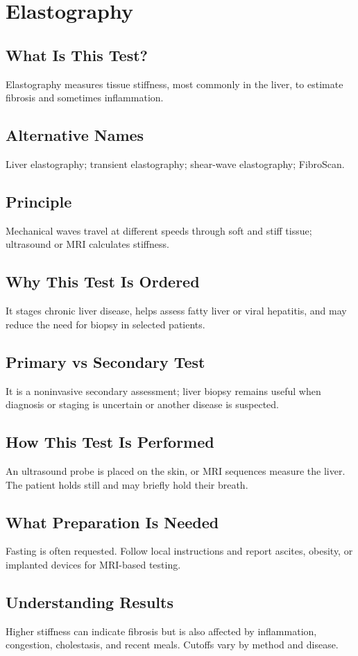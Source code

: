 \chapter{Elastography}
\section*{What Is This Test?} Elastography measures tissue stiffness, most commonly in the liver, to estimate fibrosis and sometimes inflammation.
\section*{Alternative Names} Liver elastography; transient elastography; shear-wave elastography; FibroScan.
\section*{Principle} Mechanical waves travel at different speeds through soft and stiff tissue; ultrasound or MRI calculates stiffness.
\section*{Why This Test Is Ordered} It stages chronic liver disease, helps assess fatty liver or viral hepatitis, and may reduce the need for biopsy in selected patients.
\section*{Primary vs Secondary Test} It is a noninvasive secondary assessment; liver biopsy remains useful when diagnosis or staging is uncertain or another disease is suspected.
\section*{How This Test Is Performed} An ultrasound probe is placed on the skin, or MRI sequences measure the liver. The patient holds still and may briefly hold their breath.
\section*{What Preparation Is Needed} Fasting is often requested. Follow local instructions and report ascites, obesity, or implanted devices for MRI-based testing.
\section*{Understanding Results} Higher stiffness can indicate fibrosis but is also affected by inflammation, congestion, cholestasis, and recent meals. Cutoffs vary by method and disease.
